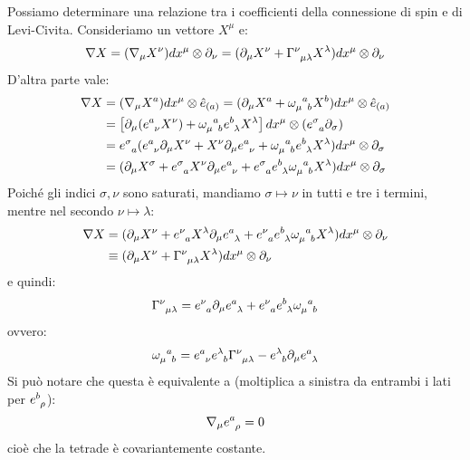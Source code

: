 Possiamo determinare una relazione tra i coefficienti della connessione di spin e di Levi-Civita. Consideriamo un vettore $X^\mu$ e:
\begin{equation*}
    \nabla X = (\nabla_\mu X^\nu) dx^\mu \otimes \partial_\nu = (\partial_\mu X^\nu + \tensor{\Gamma}{^\nu_{\mu\lambda}}X^\lambda)dx^\mu \otimes \partial_\nu
\end{equation*}
D'altra parte vale:
\begin{align*}
    \nabla X &= (\nabla_\mu X^a) dx^\mu \otimes \hat{e}_{(a)} = (\partial_\mu X^a + \tensor{\omega}{_\mu^a_b}X^b) dx^\mu \otimes \hat{e}_{(a)} \\
    &= \left[\partial_\mu( \tensor{e}{^a_\nu}X^\nu) + \tensor{\omega}{_\mu^a_b}\tensor{e}{^b_\lambda}X^\lambda\right] dx^\mu \otimes (\tensor{e}{^\sigma_a}\partial_\sigma) \\
    &= \tensor{e}{^\sigma_a}(\tensor{e}{^a_\nu}\partial_\mu X^\nu  + X^\nu\partial_\mu\tensor{e}{^a_\nu} + \tensor{\omega}{_\mu^a_b}\tensor{e}{^b_\lambda}X^\lambda ) dx^\mu \otimes \partial_\sigma \\
    &= ( \partial_\mu X^\sigma + \tensor{e}{^\sigma_a}X^\nu\partial_\mu \tensor{e}{^a_\nu} + \tensor{e}{^\sigma_a}\tensor{e}{^b_\lambda}\tensor{\omega}{_\mu^a_b} X^\lambda )dx^\mu \otimes \partial_\sigma
\end{align*}
Poiché gli indici $\sigma, \nu$ sono saturati, mandiamo $\sigma \mapsto \nu$ in tutti e tre i termini, mentre nel secondo $\nu \mapsto \lambda$:
\begin{align*}
    \nabla X &= ( \partial_\mu X^\nu + \tensor{e}{^\nu_a}X^\lambda\partial_\mu \tensor{e}{^a_\lambda} + \tensor{e}{^\nu_a}\tensor{e}{^b_\lambda}\tensor{\omega}{_\mu^a_b} X^\lambda )dx^\mu \otimes \partial_\nu \\
    &\equiv (\partial_\mu X^\nu + \tensor{\Gamma}{^\nu_{\mu\lambda}}X^\lambda)dx^\mu \otimes \partial_\nu
\end{align*}
e quindi:
\begin{equation*}
    \tensor{\Gamma}{^\nu_{\mu\lambda}} = \tensor{e}{^\nu_a}\partial_\mu\tensor{e}{^a_\lambda} + \tensor{e}{^\nu_a}\tensor{e}{^b_\lambda}\tensor{\omega}{_\mu^a_b}
\end{equation*}
ovvero:
\begin{equation}
    \tensor{\omega}{_\mu^a_b} = \tensor{e}{^a_\nu}\tensor{e}{^\lambda_b}\tensor{\Gamma}{^\nu_{\mu\lambda}} - \tensor{e}{^\lambda_b}\partial_\mu \tensor{e}{^a_\lambda}
    \label{eq.legame_conn_spin_levicivita}
\end{equation}
Si può notare che questa è equivalente a (moltiplica  a sinistra da entrambi i lati per $\tensor{e}{^b_\rho}$):
\begin{equation}
    \nabla_\mu \tensor{e}{^a_\rho} = 0
\end{equation}
cioè che la tetrade è covariantemente costante.

